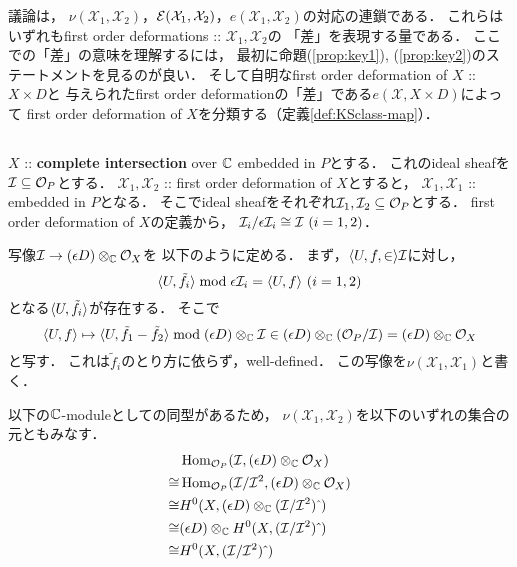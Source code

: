 \documentclass[a4paper]{jsarticle}
\newcommand{\famX}{\mathcal{X}}
\begin{document}
    議論は，
    $\nu(\famX_1, \famX_2)$，$\shE(\famX_1, \famX_2)$，$e(\famX_1, \famX_2)$の対応の連鎖である．
    これらはいずれもfirst order deformations :: $\famX_1, \famX_2$の
    「差」を表現する量である．
    ここでの「差」の意味を理解するには，
    最初に命題(\ref{prop:key1}), (\ref{prop:key2})のステートメントを見るのが良い．
    そして自明なfirst order deformation of $X$ :: $X \times D$と
    与えられたfirst order deformationの「差」である$e(\famX, X \times D)$によって
    first order deformation of $X$を分類する（定義\ref{def:KSclass-map}）．

    \subsection{\tp{$\nu(\famX_1, \famX_2)$}{v(X1,X2)}}
    \begin{Def}
        $X$ :: \textbf{complete intersection} over $\mathbb{C}$ embedded in $P$とする．
        これのideal sheafを$\mathcal{I} \subseteq \mathcal{O}_P$とする．
        $\famX_1, \famX_2$ :: first order deformation of $X$とすると，
        $\famX_1, \famX_1$ :: embedded in $P$となる．
        そこでideal sheafをそれぞれ$\mathcal{I}_1, \mathcal{I}_2 \subseteq \mathcal{O}_P$とする．
        first order deformation of $X$の定義から，
        $\shI_i/\epsilon \shI_i \iso \shI \ (i=1,2)$．

        写像$\mathcal{I} \to (\epsilon D) \otimes_{\mathbb{C}} \mathcal{O}_X$を
        以下のように定める．
        まず，$\langle U, f,\in \rangle \mathcal{I}$に対し，
        \[ \langle U,\tilde{f}_i \rangle \bmod \epsilon \mathcal{I}_i=\langle U,f \rangle \ (i=1,2) \]
        となる$\langle U,\tilde{f}_i \rangle$が存在する．
        そこで
        \[
            \langle U,f \rangle
            \mapsto
            \langle U,\tilde{f}_1-\tilde{f}_2 \rangle \bmod (\epsilon D) \otimes_{\mathbb{C}} \mathcal{I}
            \in (\epsilon D) \otimes_{\mathbb{C}} (\mathcal{O}_P/\mathcal{I})=(\epsilon D) \otimes_{\mathbb{C}} \mathcal{O}_X
        \]
        と写す．
        これは$\tilde{f}_i$のとり方に依らず，well-defined．
        この写像を$\nu(\famX_1, \famX_1)$と書く．

        以下の$\mathbb{C}$-moduleとしての同型があるため，
        $\nu(\famX_1, \famX_2)$を以下のいずれの集合の元ともみなす．
        \begin{align*}
            {}&   \operatorname{Hom}_{\mathcal{O}_P}(\mathcal{I}, (\epsilon D) \otimes_{\mathbb{C}} \mathcal{O}_X) \\
            \cong& \operatorname{Hom}_{\mathcal{O}_P}(\mathcal{I}/\mathcal{I}^2, (\epsilon D) \otimes_{\mathbb{C}} \mathcal{O}_X) \\
            \cong& H^0(X, (\epsilon D) \otimes_{\mathbb{C}} (\mathcal{I}/\mathcal{I}^2)\,\hat{}\,) \\
            \cong& (\epsilon D) \otimes_{\mathbb{C}} H^0(X, (\mathcal{I}/\mathcal{I}^2)\,\hat{}\,) \\
            \cong& H^0(X, (\mathcal{I}/\mathcal{I}^2)\,\hat{}\,)
        \end{align*}
    \end{Def}
\end{document}
